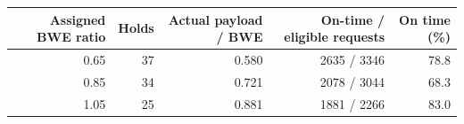 \begin{tabular}{rrrrr}
\toprule
Assigned BWE ratio & Holds & Actual payload / BWE & On-time / eligible requests & On time (\%) \\
\midrule
0.65 & 37 & 0.580 & 2635 / 3346 & 78.8 \\
0.85 & 34 & 0.721 & 2078 / 3044 & 68.3 \\
1.05 & 25 & 0.881 & 1881 / 2266 & 83.0 \\
\bottomrule
\end{tabular}
